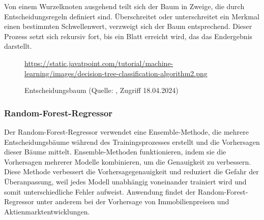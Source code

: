 Von einem Wurzelknoten ausgehend teilt sich der Baum in Zweige, die durch Entscheidungsregeln definiert sind. Überschreitet oder unterschreitet ein Merkmal einen bestimmten Schwellenwert, verzweigt sich der Baum entsprechend. Dieser Prozess setzt sich rekursiv fort, bis ein Blatt erreicht wird, das das Endergebnis darstellt.

\begin{figure}[H]
	\centering
	\urldef{\myurl}\url{https://static.javatpoint.com/tutorial/machine-learning/images/decision-tree-classification-algorithm2.png}
	\caption[Entscheidungsbaum]{Entscheidungsbaum (Quelle: \protect\myurl{}, Zugriff 18.04.2024)}
	\label{fig: Decision Tree}
\end{figure}

\subsubsection{Random-Forest-Regressor}\label{sec: Random Forest Regressor}
Der Random-Forest-Regressor verwendet eine Ensemble-Methode, die mehrere Entscheidungsbäume während des Trainingsprozesses erstellt und die Vorhersagen dieser Bäume mittelt. Ensemble-Methoden funktionieren, indem sie die Vorhersagen mehrerer Modelle kombinieren, um die Genauigkeit zu verbessern. Diese Methode verbessert die Vorhersagegenauigkeit und reduziert die Gefahr der Überanpassung, weil jedes Modell unabhängig voneinander trainiert wird und somit unterschiedliche Fehler aufweist. Anwendung findet der Random-Forest-Regressor unter anderem bei der Vorhersage von Immobilienpreisen und Aktienmarktentwicklungen.

